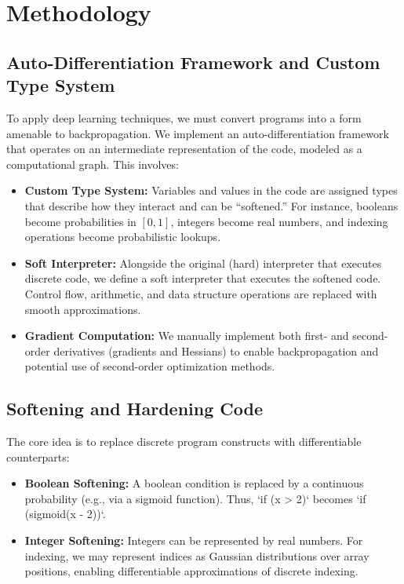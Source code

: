 \documentclass{article}
\begin{document}
\section{Methodology}

\subsection{Auto-Differentiation Framework and Custom Type System}
To apply deep learning techniques, we must convert programs into a form amenable to backpropagation. We implement an auto-differentiation framework that operates on an intermediate representation of the code, modeled as a computational graph. This involves:
\begin{itemize}
    \item \textbf{Custom Type System:} Variables and values in the code are assigned types that describe how they interact and can be ``softened.'' For instance, booleans become probabilities in $[0,1]$, integers become real numbers, and indexing operations become probabilistic lookups.
    \item \textbf{Soft Interpreter:} Alongside the original (hard) interpreter that executes discrete code, we define a soft interpreter that executes the softened code. Control flow, arithmetic, and data structure operations are replaced with smooth approximations.
    \item \textbf{Gradient Computation:} We manually implement both first- and second-order derivatives (gradients and Hessians) to enable backpropagation and potential use of second-order optimization methods.
\end{itemize}

\subsection{Softening and Hardening Code}
The core idea is to replace discrete program constructs with differentiable counterparts:
\begin{itemize}
    \item \textbf{Boolean Softening:} A boolean condition is replaced by a continuous probability (e.g., via a sigmoid function). Thus, `if (x > 2)` becomes `if (sigmoid(x - 2))`.
    \item \textbf{Integer Softening:} Integers can be represented by real numbers. For indexing, we may represent indices as Gaussian distributions over array positions, enabling differentiable approximations of discrete indexing.
\end{itemize}
\end{document}
